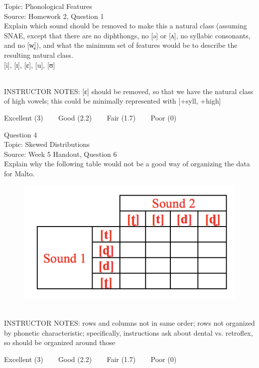 \documentclass[12pt]{article}
\begin{document}
Topic: Phonological Features\\
Source: Homework 2, Question 1\\

Explain which sound should be removed to make this a natural class (assuming SNAE, except that there are no diphthongs, no [ə] or [ʌ], no syllabic consonants, and no [w̥]), and what the minimum set of features would be to describe the resulting natural class.\\

{[i]}, {[ɪ]}, {[ɛ]}, {[u]}, {[ʊ]}


~\\
INSTRUCTOR NOTES: [ɛ] should be removed, so that we have the natural class of high vowels; this could be minimally represented with [+syll, +high]


\vfill
Excellent (3) ~~~ Good (2.2) ~~~ Fair (1.7) ~~~ Poor (0)
\newpage

{\large Question 4}\\

Topic: Skewed Distributions\\
Source: Week 5 Handout, Question 6\\

Explain why the following table would not be a good way of organizing the data for Malto.\\

\begin{figure}[H]
\includegraphics{../images/Malto_table_bad.png}
\end{figure}

~\\
INSTRUCTOR NOTES: rows and columns not in same order; rows not organized by phonetic characteristic; specifically, instructions ask about dental vs. retroflex, so should be organized around those


\vfill
Excellent (3) ~~~ Good (2.2) ~~~ Fair (1.7) ~~~ Poor (0)
\newpage
\end{document}
